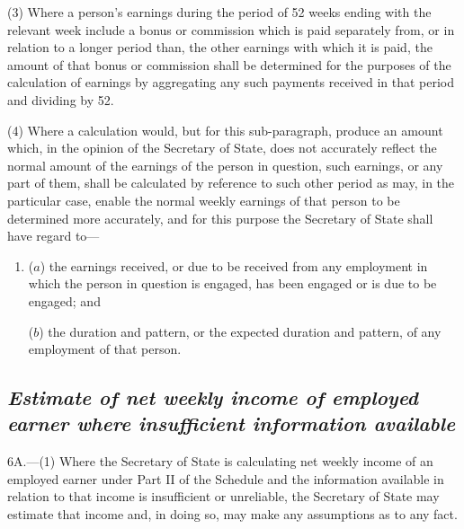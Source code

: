 \documentclass[12pt,a4paper]{article}
\begin{document}
(3) Where a person’s earnings during the period of 52 weeks ending with the relevant week include a bonus or commission 
which is paid separately from, or in relation to a longer period than, the other earnings with which it is paid, the amount of that bonus or commission shall be determined for the purposes of the calculation of earnings by aggregating any such payments received in that period and dividing by 52.

(4) Where a calculation would, but for this sub-paragraph, produce an amount which, in the opinion of the Secretary of State, does not accurately reflect the normal amount of the earnings of the person in question, such earnings, or any part of them, shall be calculated by reference to such other period as may, in the particular case, enable the normal weekly earnings of that person to be determined more accurately, and for this purpose the Secretary of State shall have regard to—
\begin{enumerate}\item[]
($a$) the earnings received, or due to be received from any employment in which the person in question is engaged, has been engaged or is due to be engaged; and

($b$) the duration and pattern, or the expected duration and pattern, of any employment of that person.
\end{enumerate}


\subsection*{\sloppy\itshape Estimate of net weekly income of employed earner where insufficient information available}

6A.---(1)  Where the 
Secretary of State  %
is calculating net weekly income of an employed earner under Part II of the Schedule and the information available in relation to that income is insufficient or unreliable, the 
Secretary of State  %
may estimate that income and, in doing so, may make any assumptions as to any fact.
\end{document}
